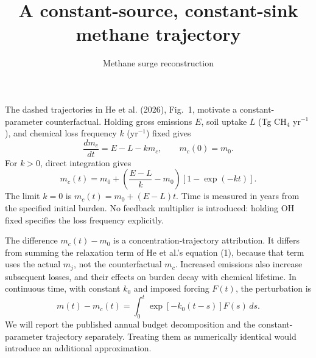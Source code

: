 \documentclass[11pt]{article}
\title{A constant-source, constant-sink methane trajectory}
\author{Methane surge reconstruction}
\date{}
\begin{document}
\maketitle
The dashed trajectories in He et al. (2026), Fig.~1, motivate a
constant-parameter counterfactual. Holding gross emissions $E$, soil
uptake $L$ (Tg CH$_4$ yr$^{-1}$), and chemical loss frequency $k$
(yr$^{-1}$) fixed gives
\begin{equation}
 \frac{dm_c}{dt}=E-L-km_c,\qquad m_c(0)=m_0.
\end{equation}
For $k>0$, direct integration gives
\begin{equation}
 m_c(t)=m_0+\left(\frac{E-L}{k}-m_0\right)
                  \left[1-\exp(-kt)\right].
\end{equation}
The limit $k=0$ is $m_c(t)=m_0+(E-L)t$. Time is measured in years
from the specified initial burden. No feedback multiplier is introduced:
holding OH fixed specifies the loss frequency explicitly.

The difference $m_c(t)-m_0$ is a concentration-trajectory attribution.
It differs from summing the relaxation term of He et al.'s equation (1),
because that term uses the actual $m_j$, not the counterfactual $m_c$.
Increased emissions also increase subsequent losses, and their effects
on burden decay with chemical lifetime. In continuous time, with constant
$k_0$ and imposed forcing $F(t)$, the perturbation is
\begin{equation}
 m(t)-m_c(t)=\int_0^t\exp[-k_0(t-s)]F(s)\,ds.
\end{equation}
We will report the published annual budget decomposition and the
constant-parameter trajectory separately. Treating them as numerically
identical would introduce an additional approximation.
\end{document}
